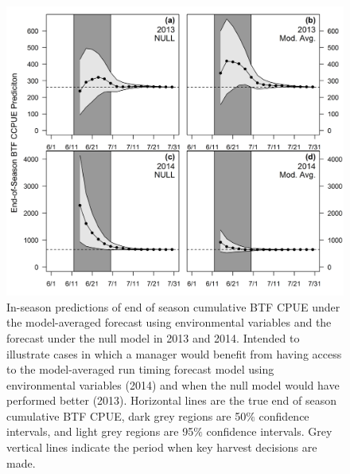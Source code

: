 \documentclass[12pt,]{book}
\theoremstyle{definition}
\theoremstyle{definition}
\theoremstyle{definition}
\theoremstyle{remark}
\begin{document}
\begin{figure}
  \centering
  \includegraphics{img/Ch2/eos-preds.png}
  \caption{In-season predictions of end of season cumulative BTF CPUE under the model-averaged forecast using environmental variables and the forecast under the null model in 2013 and 2014. Intended to illustrate cases in which a manager would benefit from having access to the model-averaged run timing forecast model using environmental variables (2014) and when the null model would have performed better (2013). Horizontal lines are the true end of season cumulative BTF CPUE, dark grey regions are 50$\%$ confidence intervals, and light grey regions are 95$\%$ confidence intervals. Grey vertical lines indicate the period when key harvest decisions are made.}
  \label{fig:eos-preds}
\end{figure}
\end{document}
